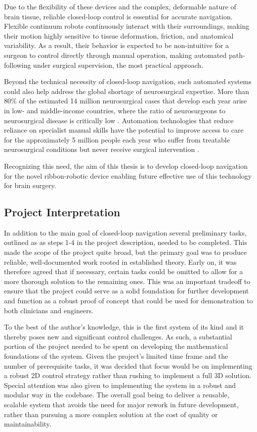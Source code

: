 Due to the flexibility of these devices and the complex, deformable nature of brain tissue, reliable closed-loop control is essential for accurate navigation. Flexible continuum robots continuously interact with their surroundings, making their motion highly sensitive to tissue deformation, friction, and anatomical variability. As a result, their behavior is expected to be non-intuitive for a surgeon to control directly through manual operation, making automated path-following under surgical supervision, the most practical approach.

Beyond the technical necessity of closed-loop navigation, such automated systems could also help address the global shortage of neurosurgical expertise. More than 80\% of the estimated 14 million neurosurgical cases that develop each year arise in low- and middle-income countries, where the ratio of neurosurgeons to neurosurgical disease is critically low \cite{dewan_global_2019}. Automation technologies that reduce reliance on specialist manual skills have the potential to improve access to care for the approximately 5 million people each year who suffer from treatable neurosurgical conditions but never receive surgical intervention \cite{dewan_global_2019}.

Recognizing this need, the aim of this thesis is to develop closed-loop navigation for the novel ribbon-robotic device enabling future effective use of this technology for brain surgery. 


\subsection{Project Interpretation}
In addition to the main goal of closed-loop navigation several preliminary tasks, outlined as  as steps 1-4 in the project description, needed to be completed. This made the scope of the project quite broad, but the primary goal was to produce reliable, well-documented work rooted in established theory. Early on, it was therefore agreed that if necessary, certain tasks could be omitted to allow for a more thorough solution to the remaining ones. This was an important tradeoff to ensure that the project could serve as a solid foundation for further development and function as a robust proof of concept that could be used for demonstration to both clinicians and engineers.

To the best of the author's knowledge, this is the first system of its kind and it thereby poses new and significant control challenges. As such, a substantial portion of the project needed to be spent on developing the mathematical foundations of the system. Given the project's limited time frame and the number of prerequisite tasks, it was decided that focus would be on implementing a robust 2D control strategy rather than rushing to implement a full 3D solution. Special attention was also given to implementing the system in a robust and modular way in the codebase. The overall goal being to deliver a reusable, scalable system that avoids the need for major rework in future development, rather than pursuing a more complex solution at the cost of quality or maintainability. 

